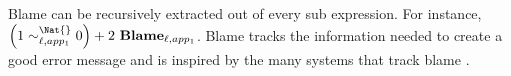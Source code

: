 Blame can be recursively extracted out of every sub expression.
For instance, $\left(1\sim_{\ell,app_{1}}^{\Nat{} }0\right)+2\ \mathbf{Blame}_{\ell,app_{1}}$.
Blame tracks the information needed to create a good error message and is inspired by the many systems that track blame \cite{10.1145/581478.581484,10.1007/978-3-642-00590-9_1,wadler:LIPIcs:2015:5033}.




